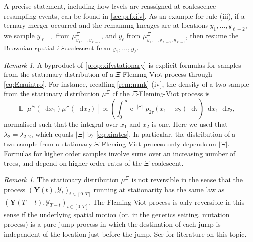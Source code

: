 \documentclass[reqno,draft]{amsart}
\numberwithin{equation}{section}
\theoremstyle{plain}
\theoremstyle{remark}
\newtheorem{remark}[theorem]{Remark}
\newcommand{\E}{\mathbb{E}} %
\newcommand*\diff{\mathop{}\!\mathrm{d}}
\newcommand{\e}{\mathrm{e}}
\begin{document}
A precise statement, including how levels are reassigned at coalescence--resampling events, can be found in \cref{sec:prfxifv}. As an example for rule (iii), if a ternary merger occurred and the remaining lineages are at locations $y_1, \ldots ,y_{\ell-2}$, we sample $y_{\ell-1}$ from $\mu^\Xi_{y_1, \ldots ,y_{\ell-2}}$, and $y_\ell$ from $\mu^\Xi_{y_1, \ldots ,y_{\ell-2},y_{\ell-1}}$, then resume the Brownian spatial $\Xi$-coalescent from $y_1, \ldots ,y_\ell$.

\begin{remark}
    A byproduct of \cref{prop:xifvstationary} is explicit formulas for samples from the stationary distribution of a $\Xi$-Fleming-Viot process through \cref{eq:Emuintro}. For instance, recalling \cref{rem:nunk} (iv), the density of a two-sample from the stationary distribution $\mu^\Xi$ of the $\Xi$-Fleming-Viot process is \[
        \E \left[ \mu^\Xi(\diff x_1) \mu^\Xi(\diff x_2) \right] \propto \left( \int_0^\infty \e^{-|\Xi| \tau} p_{2\tau}(x_1-x_2) \diff \tau \right) \diff x_1 \diff x_2,
    \] normalised such that the integral over $x_1$ and $x_2$ is one. Here we used that $\lambda_2 = \lambda_{2,2}$, which equals $|\Xi|$ by \cref{eq:xirates}. In particular, the distribution of a two-sample from a stationary $\Xi$-Fleming-Viot process only depends on $|\Xi|$. Formulas for higher order samples involve sums over an increasing number of trees, and depend on higher order rates of the $\Xi$-coalescent.
\end{remark}


\begin{remark}
    The stationary distribution $\mu^\Xi$ is not reversible in the sense that the process $(\boldsymbol Y(t),\mathcal{Y}_t)_{t\in [0,T]}$ running at stationarity has the same law as $(\boldsymbol Y(T-t),\mathcal{Y}_{T-t})_{t\in [0,T]}$. The Fleming-Viot process is only reversible in this sense if the underlying spatial motion (or, in the genetics setting, mutation process) is a pure jump process in which the destination of each jump is independent of the location just before the jump. See \cite{reversible1,reversible2,reversible3,reversible4,reversible5} for literature on this topic.
\end{remark}
\end{document}
